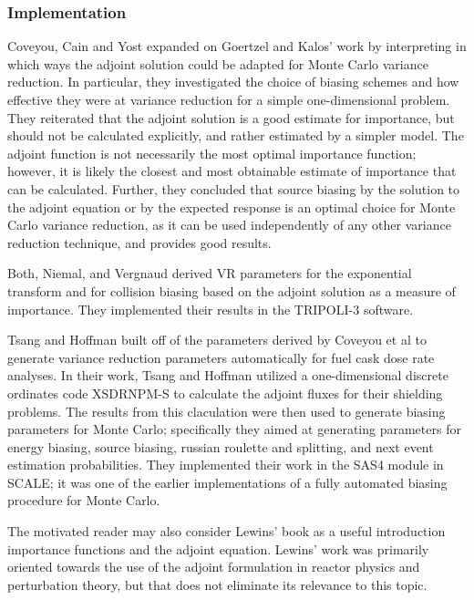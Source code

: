 \subsubsection{Implementation}

Coveyou, Cain and Yost \cite{coveyou_adjoint_1967} expanded on Goertzel and Kalos' work by interpreting in which ways the adjoint solution could be adapted for Monte Carlo variance reduction. In particular, they investigated the choice of biasing schemes and how effective they were at variance reduction for a simple one-dimensional problem. They reiterated that the adjoint solution is a good estimate for importance, but should not be calculated explicitly, and rather estimated by a simpler model. The adjoint function is not necessarily the most optimal importance function; however, it is likely the closest and most obtainable estimate of importance that can be calculated. Further, they concluded that source biasing by the solution to the adjoint equation or by the expected response is an optimal choice for Monte Carlo variance reduction, as it can be used independently of any other variance reduction technique, and provides good results.

Both, Niemal, and Vergnaud \cite{both_automated_1990} derived VR parameters for the exponential transform and for collision biasing based on the adjoint solution as a measure of importance. They implemented their results in the TRIPOLI-3 software.

Tsang and Hoffman \cite{tsang_monte_1988} built off of the parameters derived by Coveyou et al \cite{coveyou_adjoint_1967} to generate variance reduction parameters automatically for fuel cask dose rate analyses. In their work, Tsang and Hoffman utilized a one-dimensional discrete ordinates code XSDRNPM-S to calculate the adjoint fluxes for their shielding problems. The results from this claculation were then used to generate biasing parameters for Monte Carlo; specifically they aimed at generating parameters for energy biasing, source biasing, russian roulette and splitting, and next event estimation probabilities. They implemented their work in the SAS4 module in SCALE; it was one of the earlier implementations of a fully automated biasing procedure for Monte Carlo.


The motivated reader may also consider Lewins' book \cite{lewins_importance:_1965} as a
useful introduction importance functions and the adjoint equation. Lewins' work was
primarily oriented towards the use of the adjoint formulation in reactor physics and
perturbation theory, but that does not eliminate its relevance to this topic.


